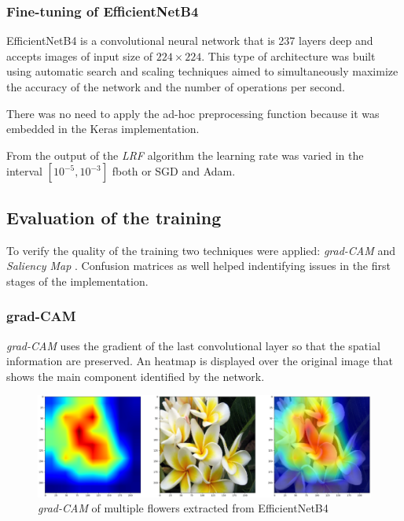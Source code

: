 \subsubsection{Fine-tuning of EfficientNetB4}\label{sec:efficientnetb4}
EfficientNetB4 is a convolutional neural network that is 237 layers deep and accepts images of input size of $224 \times 224$. 
This type of architecture was built using automatic search and scaling techniques
aimed to simultaneously maximize the accuracy of the network and the number of operations per second. \par
There was no need to apply the ad-hoc preprocessing function because it was embedded in the Keras implementation. \par
From the output of the \textit{LRF} algorithm the learning rate was varied in the interval $[10^{-5}, 10^{-3}]$ fboth or SGD and Adam.


\subsection{Evaluation of the training}
To verify the quality of the training two techniques were applied: \textit{grad-CAM} \cite{Selvaraju_2019}  and \textit{Saliency Map} \cite{simonyan2013deep}. Confusion matrices \cite{Stehman1997} as well helped indentifying
issues in the first stages of the implementation.

\subsubsection{grad-CAM}
\textit{grad-CAM} uses the gradient of the last convolutional layer so that the spatial information are preserved. An heatmap is displayed over the original image
that shows the main component identified by the network.

\begin{figure}[ht!]
\centering
\includegraphics[width=1\textwidth]{images/grad_multi.png} 
\caption{\textit{grad-CAM} of multiple flowers extracted from EfficientNetB4}
\label{fig:grad_multi}
\end{figure}

